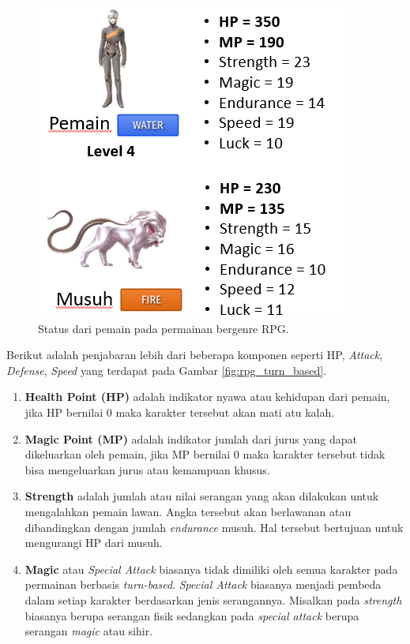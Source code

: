 \begin{enumerate}[label=\textbf{\arabic*).}]
	\begin{figure} [!h] \centering
		\includegraphics[scale=0.6]{img/player_stats.png}
		\caption{Status dari pemain pada permainan bergenre RPG.}
		\label{fig:player_stats}
	\end{figure}
	
	Berikut adalah penjabaran lebih dari beberapa komponen seperti HP, \textit{Attack}, \textit{Defense}, \textit{Speed} yang terdapat pada Gambar \ref{fig:rpg_turn_based}.
	
	\begin{enumerate}[label=\alph*).]
		\item \textbf{Health Point (HP)} adalah indikator nyawa atau kehidupan dari pemain, jika HP bernilai 0 maka karakter tersebut akan mati atu kalah.
		
		\item \textbf{Magic Point (MP)} adalah indikator jumlah dari jurus yang dapat dikeluarkan oleh pemain, jika MP bernilai 0 maka karakter tersebut tidak bisa mengeluarkan jurus atau kemampuan khusus.
		
		\item \textbf{Strength} adalah jumlah atau nilai serangan yang akan dilakukan untuk mengalahkan pemain lawan. Angka tersebut akan berlawanan atau dibandingkan dengan jumlah \textit{endurance} musuh. Hal tersebut bertujuan untuk mengurangi HP dari musuh.
		
		\item \textbf{Magic} atau \textit{Special Attack} biasanya tidak dimiliki oleh semua karakter pada permainan berbasis \textit{turn-based}. \textit{Special Attack} biasanya menjadi pembeda dalam setiap karakter berdasarkan jenis serangannya. Misalkan pada \textit{strength} biasanya berupa serangan fisik sedangkan pada \textit{special attack} berupa serangan \textit{magic} atau sihir.
		

\end{enumerate}
\end{enumerate}
